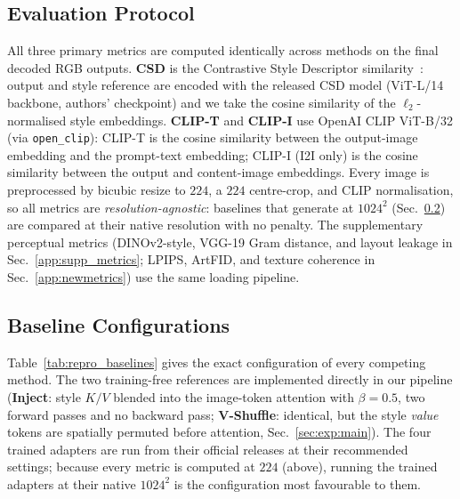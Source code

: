 \subsection{Evaluation Protocol}
\label{app:repro:eval}
All three primary metrics are computed identically across methods on the final
decoded RGB outputs. \textbf{CSD} is the Contrastive Style Descriptor
similarity~\cite{somepalli2024measuring}: output and style reference are encoded
with the released CSD model (ViT-L/14 backbone, authors' checkpoint) and we take
the cosine similarity of the $\ell_2$-normalised style embeddings.
\textbf{CLIP-T} and \textbf{CLIP-I} use OpenAI CLIP ViT-B/32 (via
\texttt{open\_clip}): CLIP-T is the cosine similarity between the output-image
embedding and the prompt-text embedding; CLIP-I (I2I only) is the cosine
similarity between the output and content-image embeddings. Every image is
preprocessed by bicubic resize to $224$, a $224$ centre-crop, and CLIP
normalisation, so all metrics are \emph{resolution-agnostic}: baselines that
generate at $1024^2$ (Sec.~\ref{app:repro:baselines}) are compared at their
native resolution with no penalty. The supplementary perceptual metrics
(DINOv2-style, VGG-19 Gram distance, and layout leakage in
Sec.~\ref{app:supp_metrics}; LPIPS, ArtFID, and texture coherence in
Sec.~\ref{app:newmetrics}) use the same loading pipeline.

\subsection{Baseline Configurations}
\label{app:repro:baselines}
Table~\ref{tab:repro_baselines} gives the exact configuration of every competing
method. The two training-free references are implemented directly in our pipeline
(\textbf{Inject}: style $K/V$ blended into the image-token attention with
$\beta=0.5$, two forward passes and no backward pass; \textbf{V-Shuffle}:
identical, but the style \emph{value} tokens are spatially permuted before
attention, Sec.~\ref{sec:exp:main}). The four trained adapters are run from their
official releases at their recommended settings; because every metric is
computed at $224$ (above), running the trained adapters at their native
$1024^2$ is the configuration most favourable to them.

